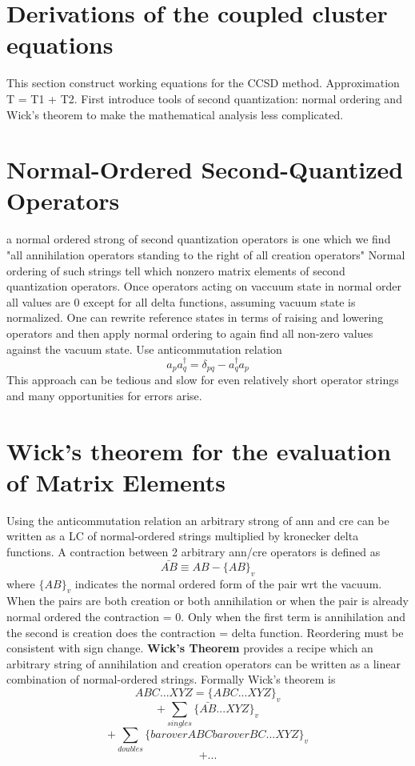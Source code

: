 \documentclass[10pt, draft]{article}
\begin{document}

\section*{Derivations of the coupled cluster equations}

This section construct working equations for the CCSD method. Approximation T = T1 + T2.  First introduce tools of second quantization: normal ordering and Wick's theorem to make the mathematical analysis less complicated.  

\section{Normal-Ordered Second-Quantized Operators}
a normal ordered strong of second quantization operators is one which we find "all annihilation operators standing to the right of all creation operators"  Normal ordering of such strings tell which nonzero matrix elements of second quantization operators.  Once operators acting on vaccuum state in normal order all values are 0 except for all delta functions, assuming vacuum state is normalized. One can rewrite reference states in terms of raising and lowering operators and then apply normal ordering to again find all non-zero values against the vacuum state.  Use anticommutation relation
\[a_p a_q^\dagger = \delta_{pq} - a_q^\dagger a_p\]
This approach can be tedious and slow for even relatively short operator strings and many opportunities for errors arise.

\section{Wick's theorem for the evaluation of Matrix Elements}
Using the anticommutation relation an arbitrary strong of ann and cre can be written as a LC of normal-ordered strings multiplied by kronecker delta functions. A contraction between 2 arbitrary ann/cre operators is defined as 
\[\bar{AB} \equiv AB - \{ AB\}_v\]
where $\{AB\}_v$ indicates the normal ordered form of the pair wrt the vacuum.  When the pairs are both creation or both annihilation or when the pair is already normal ordered the contraction = 0.  Only when the first term is annihilation and the second is creation does the contraction = delta function.  Reordering must be consistent with sign change. \linebreak[1]
\textbf{Wick's Theorem} provides a recipe which an arbitrary string of annihilation and creation operators can be written as a linear combination of normal-ordered strings.  Formally Wick's theorem is 
\[ABC...XYZ = \{ ABC ... XYZ \}_v \]
	\[+ \sum_{singles} \{ \bar{AB} ... XYZ \}_v \]
	\[ + \sum_{doubles} \{ bar over ABC bar over BC... XYZ \}_v\]
	\[+...\]
	
\end{document}
